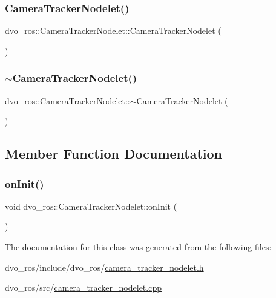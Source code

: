 \subsubsection{\texorpdfstring{Camera\+Tracker\+Nodelet()}{CameraTrackerNodelet()}}
{\footnotesize\ttfamily dvo\+\_\+ros\+::\+Camera\+Tracker\+Nodelet\+::\+Camera\+Tracker\+Nodelet (\begin{DoxyParamCaption}{ }\end{DoxyParamCaption})}

\mbox{\label{classdvo__ros_1_1_camera_tracker_nodelet_a8189fa86e3b8bfbd2397b47b4dfa17d7}} 
\subsubsection{\texorpdfstring{$\sim$\+Camera\+Tracker\+Nodelet()}{~CameraTrackerNodelet()}}
{\footnotesize\ttfamily dvo\+\_\+ros\+::\+Camera\+Tracker\+Nodelet\+::$\sim$\+Camera\+Tracker\+Nodelet (\begin{DoxyParamCaption}{ }\end{DoxyParamCaption})\hspace{0.3cm}{\ttfamily [virtual]}}



\subsection{Member Function Documentation}
\mbox{\label{classdvo__ros_1_1_camera_tracker_nodelet_a62ab6e4908aa2547c60e0247bb4cb2e3}} 
\subsubsection{\texorpdfstring{on\+Init()}{onInit()}}
{\footnotesize\ttfamily void dvo\+\_\+ros\+::\+Camera\+Tracker\+Nodelet\+::on\+Init (\begin{DoxyParamCaption}{ }\end{DoxyParamCaption})\hspace{0.3cm}{\ttfamily [virtual]}}



The documentation for this class was generated from the following files\+:\begin{DoxyCompactItemize}
\item 
dvo\+\_\+ros/include/dvo\+\_\+ros/\mbox{\hyperlink{camera__tracker__nodelet_8h}{camera\+\_\+tracker\+\_\+nodelet.\+h}}\item 
dvo\+\_\+ros/src/\mbox{\hyperlink{camera__tracker__nodelet_8cpp}{camera\+\_\+tracker\+\_\+nodelet.\+cpp}}\end{DoxyCompactItemize}
